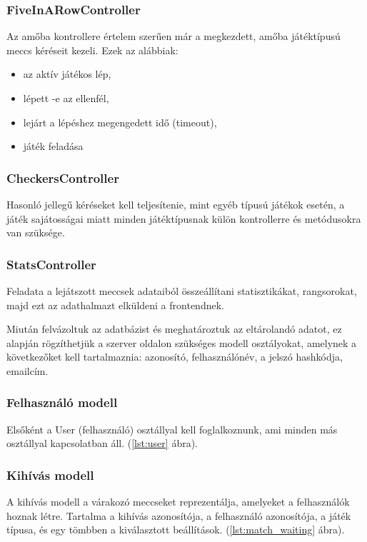 \subsubsection{FiveInARowController}
Az amőba kontrollere értelem szerűen már a megkezdett, amőba játéktípusú meccs kéréseit kezeli. Ezek az alábbiak:
\begin{itemize}
	\item az aktív játékos lép,
	\item lépett -e az ellenfél,
	\item lejárt a lépéshez megengedett idő (timeout),
	\item játék feladása
\end{itemize}

\subsubsection{CheckersController}
Hasonló jellegű kéréseket kell teljesítenie, mint egyéb típusú játékok esetén, a játék sajátosságai miatt minden játéktípusnak külön kontrollerre és metódusokra van szüksége.

\subsubsection{StatsController}
Feladata a lejátszott meccsek adataiból összeállítani statisztikákat, rangsorokat, majd ezt az adathalmazt elküldeni a frontendnek.




Miután felvázoltuk az adatbázist és meghatároztuk az eltárolandó adatot, ez alapján rögzíthetjük a szerver oldalon szükséges modell osztályokat, amelynek a következőket kell tartalmaznia: azonosító, felhasználónév, a jelszó hashkódja, emailcím.


\subsubsection{Felhasználó modell}
Elsőként a User (felhasználó) osztállyal kell foglalkoznunk, ami minden más osztállyal kapcsolatban áll. (\ref{lst:user} ábra).



\subsubsection{Kihívás modell}
A kihívás modell a várakozó meccseket reprezentálja, amelyeket a felhasználók hoznak létre. Tartalma a kihívás azonosítója, a felhasználó azonosítója, a játék típusa, és egy tömbben a kiválasztott beállítások. (\ref{lst:match_waiting} ábra).

